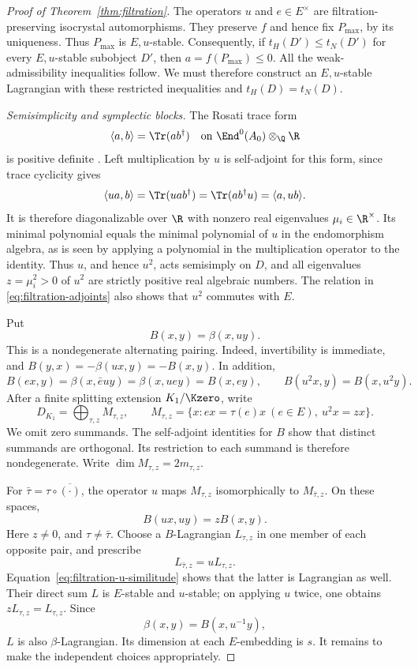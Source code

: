 \begin{proof}[Proof of Theorem~\ref{thm:filtration}]
The operators $u$ and $e\in E^\times$ are filtration-preserving
isocrystal automorphisms.  They preserve $f$ and hence fix
$P_{\max}$, by its uniqueness.  Thus $P_{\max}$ is $E,u$-stable.
Consequently, if $t_H(D')\leq t_N(D')$ for every $E,u$-stable
subobject $D'$, then $a=f(P_{\max})\leq0$. All the
weak-admissibility inequalities follow. We must therefore construct
an $E,u$-stable Lagrangian with these restricted inequalities and
$t_H(D)=t_N(D)$.

\medskip\noindent
\emph{Semisimplicity and symplectic blocks.}
The Rosati trace form
\[
 \langle a,b\rangle=\Tr(ab^\dagger)
 \quad\text{on }\End^0(A_0)\otimes_\Q\R
\]
is positive definite \cite[Theorem~17.3]{MilneAV}.  Left multiplication
by $u$ is self-adjoint for this form, since trace cyclicity gives
\[
 \langle ua,b\rangle=\Tr(uab^\dagger)
 =\Tr(ab^\dagger u)=\langle a,ub\rangle.
\]
It is therefore diagonalizable over $\R$ with nonzero real eigenvalues
$\mu_i\in\R^\times$.  Its minimal polynomial equals the
minimal polynomial of $u$ in the endomorphism algebra, as is seen by
applying a polynomial in the multiplication operator to the identity.
Thus $u$, and hence $u^2$, acts semisimply on $D$, and all eigenvalues
$z=\mu_i^2>0$ of $u^2$ are strictly positive real algebraic numbers.
The relation in
\eqref{eq:filtration-adjoints} also shows that $u^2$ commutes with $E$.

Put
\[
 B(x,y)=\beta(x,uy).
\]
This is a nondegenerate alternating pairing.  Indeed, invertibility is
immediate, and
$B(y,x)=-\beta(ux,y)=-B(x,y)$.  In addition,
\[
 B(ex,y)=\beta(x,\bar euy)=\beta(x,uey)=B(x,ey),
 \qquad B(u^2x,y)=B(x,u^2y).
\]
After a finite splitting extension $K_1/\Kzero$, write
\[
 D_{K_1}=\bigoplus_{\tau,z}M_{\tau,z},
 \qquad
 M_{\tau,z}=\{x:ex=\tau(e)x\ (e\in E),\ u^2x=zx\}.
\]
We omit zero summands.  The self-adjoint identities for $B$ show that
distinct summands are orthogonal.  Its restriction to each summand is
therefore nondegenerate.  Write $\dim M_{\tau,z}=2m_{\tau,z}$.

For $\bar\tau=\tau\circ\overline{(\cdot)}$, the operator $u$ maps
$M_{\tau,z}$ isomorphically to $M_{\bar\tau,z}$.  On these spaces,
\begin{equation}
\label{eq:filtration-u-similitude}
 B(ux,uy)=zB(x,y).
\end{equation}
Here $z\neq 0$, and $\tau\neq\bar\tau$.  Choose a $B$-Lagrangian
$L_{\tau,z}$ in one member of each opposite pair, and prescribe
\begin{equation}
\label{eq:filtration-opposite-choice}
 L_{\bar\tau,z}=uL_{\tau,z}.
\end{equation}
Equation~\eqref{eq:filtration-u-similitude} shows that the latter is
Lagrangian as well.  Their direct sum $L$ is $E$-stable and $u$-stable;
on applying $u$ twice, one obtains $zL_{\tau,z}=L_{\tau,z}$.  Since
\[
 \beta(x,y)=B(x,u^{-1}y),
\]
$L$ is also $\beta$-Lagrangian.  Its dimension at each $E$-embedding
is $s$.  It remains to make the independent choices appropriately.


\end{proof}
